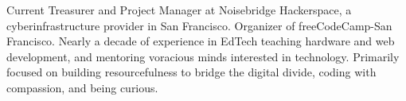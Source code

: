 

\begin{cvparagraph}

Current Treasurer and Project Manager at Noisebridge Hackerspace, a cyberinfrastructure provider in San Francisco. Organizer of freeCodeCamp-San Francisco. Nearly a decade of experience in EdTech teaching hardware and web development, and mentoring voracious minds interested in technology. Primarily focused on building resourcefulness to bridge the digital divide, coding with compassion, and being curious.
\end{cvparagraph}

